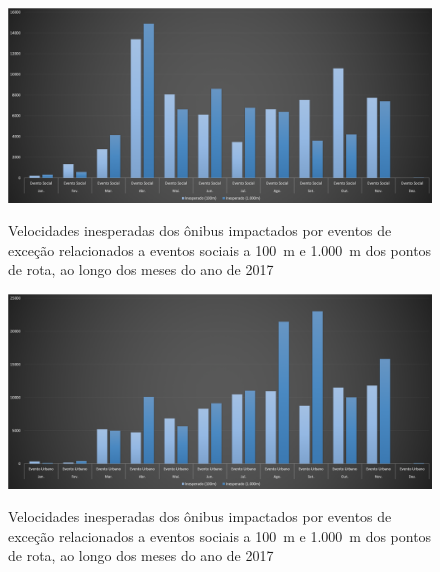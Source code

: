 \documentclass[
	12pt,				%
	oneside,			%
	a4paper,			%
	english,			%
	brazil				%
	]{abntex2ppgsi}
\begin{document}
{{\begin{figure}[!htb]
	\centering
 	  \caption{Velocidades inesperadas dos ônibus impactados por eventos de exceção relacionados a eventos sociais a 100~m e 1.000~m dos pontos de rota, ao longo dos meses do ano de 2017}
		\includegraphics[width=1\linewidth]{images/apriori_analysis_shapes_social_events.png}
	\label{fig:apriori_analysis_shapes_social_events}
\end{figure}

\begin{figure}[!htb]
	\centering
 	  \caption{Velocidades inesperadas dos ônibus impactados por eventos de exceção relacionados a eventos sociais a 100~m e 1.000~m dos pontos de rota, ao longo dos meses do ano de 2017}
		\includegraphics[width=1\linewidth]{images/apriori_analysis_shapes_urban_events.png}
	\label{fig:apriori_analysis_shapes_urban_events}
\end{figure}



}}
\end{document}
